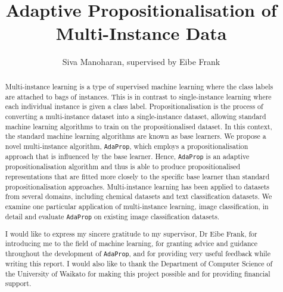 \documentclass[a4paper,12pt]{report} %
\title{\ \\ \  \\ Adaptive Propositionalisation of Multi-Instance Data}
\author{Siva Manoharan, supervised by Eibe Frank}
\date{} %
\newcommand{\AdaProp}{\texttt{AdaProp}\xspace}
\begin{document}
 

\onehalfspacing
{}  %




\begin{abstract} 
Multi-instance learning is a type of supervised machine learning 
    where the class labels are attached to bags of instances. 
This is in contrast to single-instance learning 
    where each individual instance is given a class label.
Propositionalisation is the process of 
    converting a multi-instance dataset into a single-instance dataset, 
    allowing standard machine learning algorithms 
    to train on the propositionalised dataset. 
In this context, the standard machine learning algorithms are 
	known as base learners.
We propose a novel multi-instance algorithm, \AdaProp, 
	which employs a propositionalisation approach that 
	is influenced by the base learner.
Hence, \AdaProp is an adaptive propositionalisation algorithm
	and thus is able to produce propositionalised representations that 
	are fitted more closely to the specific base learner than
	standard propositionalisation approaches.
Multi-instance learning has been applied to datasets from 
	several domains, including chemical datasets and text classification datasets.
We examine one particular application of multi-instance learning, image classification, in detail and 
	evaluate \AdaProp on existing image classification datasets.
\end{abstract}


\renewcommand{\abstractname}{Acknowledgements}
\begin{abstract}
I would like to express my sincere gratitude to my supervisor,
Dr Eibe Frank,
for introducing me to the field of machine learning, 
for granting advice and guidance throughout the development of \AdaProp, and 
for providing very useful feedback while writing this report.
I would also like to thank the Department of Computer Science
	of the University of Waikato for making this project possible
	and for providing financial support.

\end{abstract}



\thispagestyle{empty}
\clearpage
{}  
\end{document}
